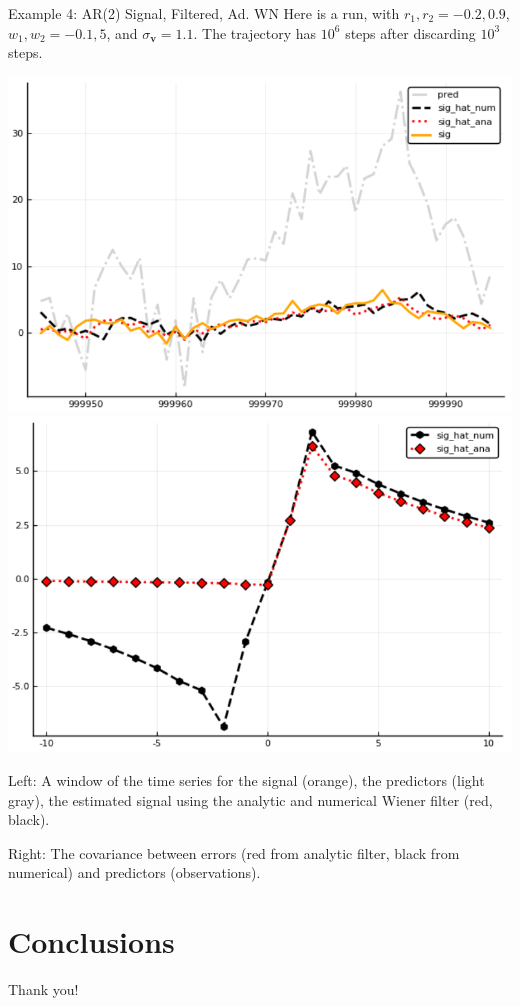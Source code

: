 \documentclass{beamer}  %
\begin{document}

\begin{frame}{Example 4: AR(2) Signal, Filtered, Ad. WN}
	Here is a run, with $r_1,r_2 = -0.2, 0.9$, $w_1,w_2 = -0.1, 5$, and $\sigma_{\textbf{v}} = 1.1$. The trajectory has $10^6$ steps after discarding $10^3$ steps. 
	
	\includegraphics[scale=.33]{fig/figAR2F_ts.png}
	\includegraphics[scale=.33]{fig/figAR2F_cov.png}
	
	Left: A window of the time series for the signal (orange), the predictors (light gray), the estimated signal using the analytic and numerical Wiener filter (red, black). 
	
	Right: The covariance between errors (red from analytic filter, black from numerical) and predictors (observations). \\
\end{frame}


\section{Conclusions}



\begin{frame}
Thank you!
\end{frame}
\end{document}
